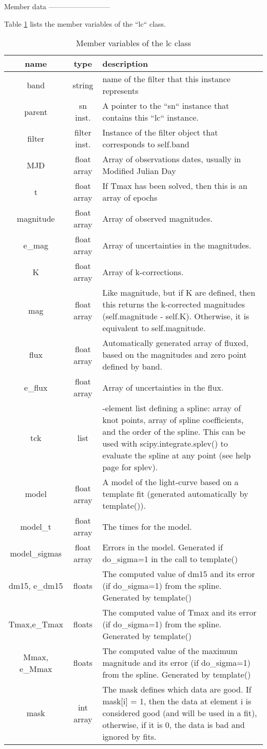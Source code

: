 Member data
--------------------------

Table \ref{tab:lc_member_var} lists the member variables of the ``lc``
class. 

\begin{table}
\begin{tabular}{|c|c|>{\centering}p{4in}|}
\hline 
name & type & description\tabularnewline
\hline 
\hline 
band & string & name of the filter that this instance represents\tabularnewline
\hline 
parent & sn inst. & A pointer to the ``sn`` instance that contains this ``lc``
instance.\tabularnewline
\hline 
filter & filter inst. & Instance of the filter object that corresponds to self.band\tabularnewline
\hline 
MJD & float array & Array of observations dates, usually in Modified Julian Day\tabularnewline
\hline 
t & float array & If Tmax has been solved, then this is an array of epochs\tabularnewline
\hline 
magnitude & float array & Array of observed magnitudes.\tabularnewline
\hline 
e_mag & float array & Array of uncertainties in the magnitudes.\tabularnewline
\hline 
K & float array & Array of k-corrections.\tabularnewline
\hline 
mag & float array & Like magnitude, but if K are defined, then this returns the k-corrected
magnitudes (self.magnitude - self.K). Otherwise, it is equivalent
to self.magnitude.\tabularnewline
\hline 
flux & float array & Automatically generated array of fluxed, based on the magnitudes and
zero point defined by band.\tabularnewline
\hline 
e_flux & float array & Array of uncertainties in the flux.\tabularnewline
\hline 
tck & list & 3-element list defining a spline: array of knot points, array of spline
coefficients, and the order of the spline. This can be used with scipy.integrate.splev()
to evaluate the spline at any point (see help page for splev).\tabularnewline
\hline 
model & float array & A model of the light-curve based on a template fit (generated automatically
by template()).\tabularnewline
\hline 
model_t & float array & The times for the model.\tabularnewline
\hline 
model_sigmas & float array & Errors in the model. Generated if do_sigma=1 in the call to template() \tabularnewline
\hline 
dm15, e_dm15 & floats & The computed value of dm15 and its error (if do_sigma=1) from the
spline. Generated by template()\tabularnewline
\hline 
Tmax,e_Tmax & floats & The computed value of Tmax and its error (if do_sigma=1) from the
spline. Generated by template()\tabularnewline
\hline 
Mmax, e_Mmax & floats & The computed value of the maximum magnitude and its error (if do_sigma=1)
from the spline. Generated by template()\tabularnewline
\hline 
mask & int array & The mask defines which data are good. If mask{[}i{]} = 1, then the
data at element i is considered good (and will be used in a fit),
otherwise, if it is 0, the data is bad and ignored by fits.\tabularnewline
\hline 
\end{tabular}

\caption{Member variables of the lc class\label{tab:lc_member_var}}
\end{table}



